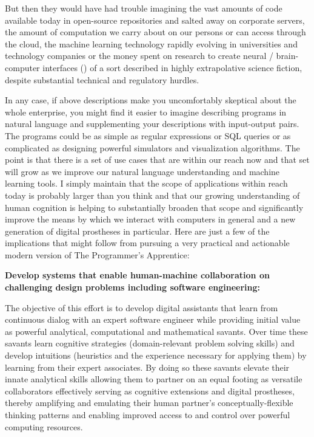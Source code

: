 But then they would have had trouble imagining the vast amounts of code available today in open-source repositories and salted away on corporate servers, the amount of computation we carry about on our persons or can access through the cloud, the machine learning technology rapidly evolving in universities and technology companies or the money spent on research to create neural / brain-computer interfaces ({}) of a sort described in highly extrapolative science fiction, despite substantial technical and regulatory hurdles.

In any case, if above descriptions make you uncomfortably skeptical about the whole enterprise, you might find it easier to imagine describing programs in natural language and supplementing your descriptions with input-output pairs. The programs could be as simple as regular expressions or SQL queries or as complicated as designing powerful simulators and visualization algorithms. The point is that there is a set of use cases that are within our reach now and that set will grow as we improve our natural language understanding and machine learning tools. I simply maintain that the scope of applications within reach today is probably larger than you think and that our growing understanding of human cognition is helping to substantially broaden that scope and significantly improve the means by which we interact with computers in general and a new generation of digital prostheses in particular. Here are just a few of the implications that might follow from pursuing a very practical and actionable modern version of The Programmer's Apprentice:


{\bf{Develop systems that enable human-machine collaboration on challenging design problems including software engineering:}}

The objective of this effort is to develop digital assistants that learn from continuous dialog with an expert software engineer while providing initial value as powerful analytical, computational and mathematical savants. Over time these savants learn cognitive strategies (domain-relevant problem solving skills) and develop intuitions (heuristics and the experience necessary for applying them) by learning from their expert associates. By doing so these savants elevate their innate analytical skills allowing them to partner on an equal footing as versatile collaborators \emdash{} effectively serving as cognitive extensions and digital prostheses, thereby amplifying and emulating their human partner's conceptually-flexible thinking patterns and enabling improved access to and control over powerful computing resources. 

